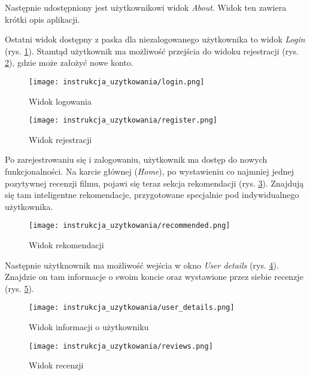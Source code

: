 \documentclass[../main.tex]{subfiles}
\begin{document}
Następnie udostępniony jest użytkownikowi widok \textit{About}. Widok ten zawiera krótki opis aplikacji.

Ostatni widok dostępny z paska dla niezalogowanego użytkownika to widok \textit{Login} (rys. \ref{fig:instrukcja_uzytkowania:login}). Stamtąd użytkownik ma możliwość przejścia do widoku rejestracji (rys. \ref{fig:instrukcja_uzytkowania:register}), gdzie może założyć nowe konto.

\begin{figure}[htb]
	\texttt{[image: instrukcja\_uzytkowania/login.png]}
	\caption{Widok logowania}
	\label{fig:instrukcja_uzytkowania:login}
\end{figure}

\begin{figure}[htb]
	\texttt{[image: instrukcja\_uzytkowania/register.png]}
	\caption{Widok rejestracji}
	\label{fig:instrukcja_uzytkowania:register}
\end{figure}

Po zarejestrowaniu się i zalogowaniu, użytkownik ma dostęp do nowych funkcjonalności. Na karcie głównej (\textit{Home}), po wystawieniu co najmniej jednej pozytywnej recenzji filmu, pojawi się teraz sekcja rekomendacji (rys. \ref{fig:instrukcja_uzytkowania:recommended}). Znajdują się tam inteligentne rekomendacje, przygotowane specjalnie pod indywidualnego użytkownika.

\begin{figure}[htb]
	\texttt{[image: instrukcja\_uzytkowania/recommended.png]}
	\caption{Widok rekomendacji}
	\label{fig:instrukcja_uzytkowania:recommended}
\end{figure}

Następnie użytknownik ma możliwość wejścia w okno \textit{User details} (rys. \ref{fig:instrukcja_uzytkowania:user_details}). Znajdzie on tam informacje o swoim koncie oraz wystawione przez siebie recenzje (rys. \ref{fig:instrukcja_uzytkowania:reviews}).

\begin{figure}[htb]
	\texttt{[image: instrukcja\_uzytkowania/user\_details.png]}
	\caption{Widok informacji o użytkowniku}
	\label{fig:instrukcja_uzytkowania:user_details}
\end{figure}

\begin{figure}[htb]
	\texttt{[image: instrukcja\_uzytkowania/reviews.png]}
	\caption{Widok recenzji}
	\label{fig:instrukcja_uzytkowania:reviews}
\end{figure}
\end{document}
